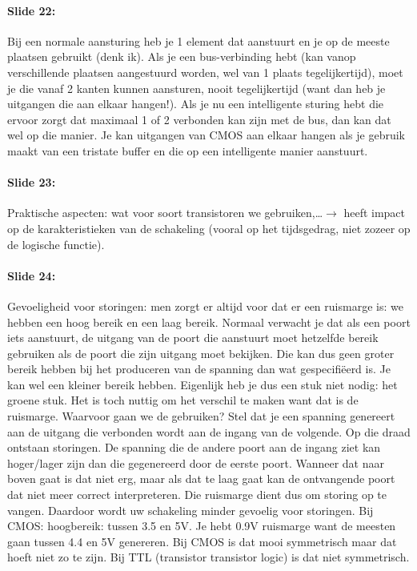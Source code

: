 \documentclass[10pt,a4paper]{book}
\begin{document}
\paragraph{Slide 22:} Bij een normale aansturing heb je 1 element dat aanstuurt en je op de meeste plaatsen gebruikt (denk ik). Als je een bus-verbinding hebt (kan vanop verschillende plaatsen aangestuurd worden, wel van 1 plaats tegelijkertijd), moet je die vanaf 2 kanten kunnen aansturen, nooit tegelijkertijd (want dan heb je uitgangen die aan elkaar hangen!). Als je nu een intelligente sturing hebt die ervoor zorgt dat maximaal 1 of 2 verbonden kan zijn met de bus, dan kan dat wel op die manier. Je kan uitgangen van CMOS aan elkaar hangen als je gebruik maakt van een tristate buffer en die op een intelligente manier aanstuurt. 

\paragraph{Slide 23:} Praktische aspecten: wat voor soort transistoren we gebruiken,\ldots $\rightarrow$ heeft impact op de karakteristieken van de schakeling (vooral op het tijdsgedrag, niet zozeer op de logische functie). 

\paragraph{Slide 24:} Gevoeligheid voor storingen: men zorgt er altijd voor dat er een ruismarge is: we hebben een hoog bereik en een laag bereik. Normaal verwacht je dat als een poort iets aanstuurt, de uitgang van de poort die aanstuurt moet hetzelfde bereik gebruiken als de poort die zijn uitgang moet bekijken. Die kan dus geen groter bereik hebben bij het produceren van de spanning dan wat gespecifi\"eerd is. Je kan wel een kleiner bereik hebben. Eigenlijk heb je dus een stuk niet nodig: het groene stuk. Het is toch nuttig om het verschil te maken want dat is de ruismarge. Waarvoor gaan we de gebruiken? Stel dat je een spanning genereert aan de uitgang die verbonden wordt aan de ingang van de volgende. Op die draad ontstaan storingen. De spanning die de andere poort aan de ingang ziet kan hoger/lager zijn dan die gegenereerd door de eerste poort. Wanneer dat naar boven gaat is dat niet erg, maar als dat te laag gaat kan de ontvangende poort dat niet meer correct interpreteren. Die ruismarge dient dus om storing op te vangen. Daardoor wordt uw schakeling minder gevoelig voor storingen. Bij CMOS: hoogbereik: tussen 3.5 en 5V. Je hebt 0.9V ruismarge want de meesten gaan tussen 4.4 en 5V genereren.
Bij CMOS is dat mooi symmetrisch maar dat hoeft niet zo te zijn. Bij TTL (transistor transistor logic) is dat niet symmetrisch. 
\end{document}
